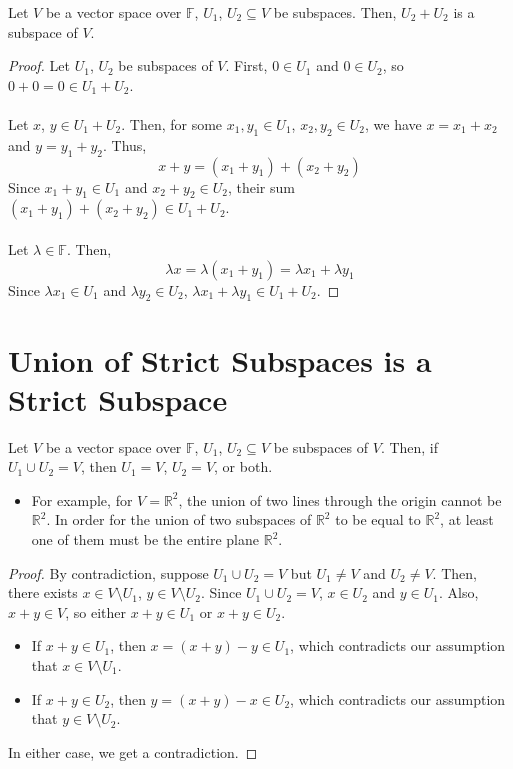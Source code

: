 \documentclass[letterpaper,12pt]{article}
\begin{document}
\begin{theorem}
Let $V$ be a vector space over $\mathbb{F}$, $U_1$, $U_2 \subseteq V$ be subspaces. Then, $U_2 + U_2$ is a subspace of $V$.
\end{theorem}
\begin{proof}
Let $U_1$, $U_2$ be subspaces of $V$. First, $0 \in U_1$ and $0 \in U_2$, so $0 + 0 = 0 \in U_1 + U_2$.
\\ \\ Let $x$, $y \in U_1 + U_2$. Then, for some $x_1, y_1 \in U_1$, $x_2, y_2 \in U_2$, we have $x = x_1 + x_2$ and $y = y_1 + y_2$. Thus,
\begin{equation*}
    x + y = (x_1 + y_1) + (x_2 + y_2)
\end{equation*}
Since $x_1 + y_1 \in U_1$ and $x_2 + y_2 \in U_2$, their sum $(x_1 + y_1) + (x_2 + y_2) \in U_1 + U_2$.
\\ \\ Let $\lambda \in \mathbb{F}$. Then,
\begin{equation*}
    \lambda x = \lambda (x_1 + y_1) = \lambda x_1 + \lambda y_1
\end{equation*}
Since $\lambda x_1 \in U_1$ and $\lambda y_2 \in U_2$, $\lambda x_1 + \lambda y_1 \in U_1 + U_2$.
\end{proof}

\section*{Union of Strict Subspaces is a Strict Subspace}
\begin{theorem}
Let $V$ be a vector space over $\mathbb{F}$, $U_1$, $U_2 \subseteq V$ be subspaces of $V$. Then, if $U_1 \cup U_2 = V$, then $U_1 = V$, $U_2 = V$, or both.
\begin{itemize}
    \item For example, for $V = \mathbb{R}^2$, the union of two lines through the origin cannot be $\mathbb{R}^2$. In order for the union of two subspaces of $\mathbb{R}^2$ to be equal to $\mathbb{R}^2$, at least one of them must be the entire plane $\mathbb{R}^2$.
\end{itemize}
\end{theorem}
\begin{proof}
By contradiction, suppose $U_1 \cup U_2 = V$ but $U_1 \neq V$ and $U_2 \neq V$. Then, there exists $x \in V \setminus U_1$, $y \in V \setminus U_2$. Since $U_1 \cup U_2 = V$, $x \in U_2$ and $y \in U_1$. Also, $x + y \in V$, so either $x + y \in U_1$ or $x + y \in U_2$.
\begin{itemize}
    \item If $x + y \in U_1$, then $x = (x + y) - y \in U_1$, which contradicts our assumption that $x \in V \setminus U_1$.
    \item If $x + y \in U_2$, then $y = (x + y) - x \in U_2$, which contradicts our assumption that $y \in V \setminus U_2$.
\end{itemize}
In either case, we get a contradiction.
\end{proof}
\end{document}
